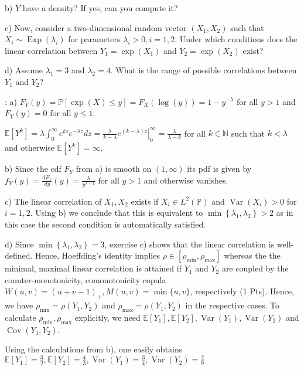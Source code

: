 b) $Y$ have a density? If yes, can you compute it?

c) Now, consider a two-dimensional random vector $\left(X_{1}, X_{2}\right)$ such that $X_{i} \sim \operatorname{Exp}\left(\lambda_{i}\right)$ for parameters $\lambda_{i}>0, i=1,2$. Under which conditions does the linear correlation between $Y_{1}=\exp \left(X_{1}\right)$ and $Y_{2}=\exp \left(X_{2}\right)$ exist?

d) Assume $\lambda_{1}=3$ and $\lambda_{2}=4$. What is the range of possible correlations between $Y_{1}$ and $Y_{2}$?


:
a)
$
F_{Y}(y)=\mathbb{P}[\exp (X) \leq y]=F_{X}(\log (y))=1-y^{-\lambda}
$
for all $y>1$ and $F_{Y}(y)=0$ for all $y \leq 1$. 

$
\mathbb{E}\left[Y^{k}\right]=\lambda \int_{0}^{\infty} e^{k z} e^{-\lambda z} d z=\left.\frac{\lambda}{k-\lambda} e^{(k-\lambda) z}\right|_{0} ^{\infty}=\frac{\lambda}{\lambda-k}
$
for all $k \in \mathbb{N}$ such that $k<\lambda$ and otherwise $\mathbb{E}\left[Y^{k}\right]=\infty$.

b) Since the cdf $F_{Y}$ from a) is smooth on $(1, \infty)$ its pdf is given by
$
f_{Y}(y)=\frac{d F_{Y}}{d y}(y)=\frac{\lambda}{y^{\lambda+1}}
$
for all $y>1$ and otherwise vanishes.

c) The linear correlation of $X_{1}, X_{2}$ exists if $X_{i} \in L^{2}(\mathbb{P})$ and $\operatorname{Var}\left(X_{i}\right)>0$ for $i=1,2$. Using b) we conclude that this is equivalent to $\min \left\{\lambda_{1}, \lambda_{2}\right\}>2$ as in this case the second condition is automatically satisfied.

d) Since $\min \left\{\lambda_{1}, \lambda_{2}\right\}=3$, exercise c) shows that the linear correlation is well-defined. Hence, Hoeffding's identity implies $\rho \in\left[\rho_{\min }, \rho_{\max }\right]$ whereas the the minimal, maximal linear correlation is attained if $Y_{1}$ and $Y_{2}$ are coupled by the counter-monotonicity, comonotonicity copula $W(u, v)=(u+v-1)_{+}, M(u, v)=\min \{u, v\}$, respectively (1 Pts). Hence, we have $\rho_{\min }=\rho\left(Y_{1}, Y_{2}\right)$ and $\rho_{\max }=\rho\left(Y_{1}, Y_{2}\right)$ in the respective cases. To calculate $\rho_{\min }, \rho_{\max }$ explicitly, we need $\mathbb{E}\left[Y_{1}\right], \mathbb{E}\left[Y_{2}\right], \operatorname{Var}\left(Y_{1}\right), \operatorname{Var}\left(Y_{2}\right)$ and $\operatorname{Cov}\left(Y_{1}, Y_{2}\right)$. 

Using the calculations from b), one easily obtains
$
\mathbb{E}\left[Y_{1}\right]=\frac{3}{2}, \mathbb{E}\left[Y_{2}\right]=\frac{4}{3}, \operatorname{Var}\left(Y_{1}\right)=\frac{3}{4}, \operatorname{Var}\left(Y_{2}\right)=\frac{2}{9}
$

